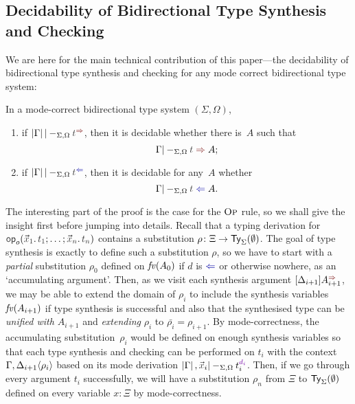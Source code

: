 \subsection{Decidability of Bidirectional Type Synthesis and Checking}\label{subsec:bidirectional-synthesis-checking}
We are here for the main technical contribution of this paper---the decidability of bidirectional type synthesis and checking for any mode correct bidirectional type system:
\begin{theorem} \label{thm:bidirectional-type-synthesis-checking}
  In a mode-correct bidirectional type system $(\Sigma, \Omega)$,
  \begin{enumerate}
    \item if\/ $\erase{\Gamma} |-_{\Sigma, \Omega} \isTerm{t}^{\syn}$, then it is decidable whether there is~$A$ such that
      \[
        \Gamma |-_{\Sigma, \Omega} \isTerm{t} \syn A;
      \]
    \item if\/ $\erase{\Gamma} |-_{\Sigma, \Omega} \isTerm{t}^{\chk}$, then it is decidable for any~$A$ whether
      \[
        \Gamma |-_{\Sigma, \Omega} \isTerm{t} \chk A.
      \]
  \end{enumerate}
\end{theorem}

The interesting part of the proof is the case for the $\textnormal{\textsc{Op}}$ rule, so we shall give the insight first before jumping into details.
Recall that a typing derivation for $\tmOpts$ contains a substitution $\rho\colon \Xi \to \mathsf{Ty}_{\Sigma}(\emptyset)$.
The goal of type synthesis is exactly to define such a substitution $\rho$, so we have to start with a \emph{partial} substitution $\rho_0$ defined on $\mathit{fv}(A_0)$ if $d$ is $\chk$ or otherwise nowhere, as an `accumulating argument'.
Then, as we visit each synthesis argument $\synbiarg[i+1]$, we may be able to extend the domain of $\rho_i$ to include the synthesis variables $\mathit{fv}(A_{i + 1})$ if type synthesis is successful and also that the synthesised type can be \emph{unified with $A_{i+ 1}$} and \emph{extending} $\rho_i$ to $\bar{\rho_i} = \rho_{i+1}$.
By mode-correctness, the accumulating substitution~$\rho_i$ would be defined on enough synthesis variables so that each type synthesis and checking can be performed on $t_{i}$ with the context $\Gamma, {\Delta_{i+1}}\!\left<{\rho_i}\right>$ based on its mode derivation $\erase{\Gamma}, \vars{x}_i |-_{\Sigma, \Omega} t_i^{\dir{d_i}}$.
Then, if we go through every argument $t_i$ successfully, we will have a substitution $\rho_n$ from $\Xi$ to $\mathsf{Ty}_{\Sigma}(\emptyset)$ defined on every variable $x : \Xi$ by mode-correctness.

